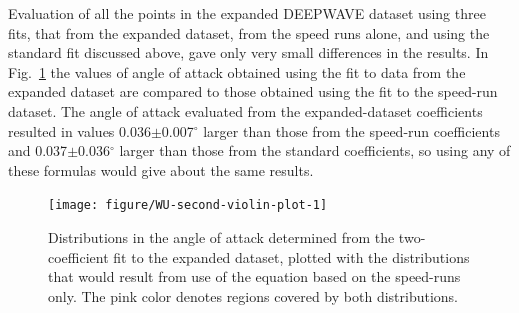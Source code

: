 \documentclass[12pt,twoside,english]{article}\usepackage[]{graphicx}\usepackage[]{color}
\newenvironment{knitrout}{}{} %
\begin{document}
Evaluation of all the points in the expanded DEEPWAVE dataset using three fits, that from the expanded dataset, from the speed runs alone, and using the \textquotedbl{}standard\textquotedbl{} fit discussed above, gave only very small differences in the results. In Fig.~\ref{fig:second-violin-plot} the values of angle of attack obtained using the fit to data from the expanded dataset are compared to those obtained using the fit to the speed-run dataset. 
The angle of attack evaluated from the expanded-dataset coefficients resulted in values  
0.036$\pm$0.007$^{\circ}$  
larger than those from the speed-run coefficients and  
0.037$\pm$0.036$^{\circ}$  
larger than those from the standard coefficients, so using any of these formulas would give about the same results. 


\begin{knitrout}\footnotesize
{}\color{fgcolor}\begin{figure}

{\centering \texttt{[image: figure/WU-second-violin-plot-1]} 

}

\caption[Distributions in the angle of attack determined from the two-coefficient fit to the expanded dataset, plotted with the distributions that would result from use of the equation based on the speed-runs only]{Distributions in the angle of attack determined from the two-coefficient fit to the expanded dataset, plotted with the distributions that would result from use of the equation based on the speed-runs only. The pink color denotes regions covered by both distributions.}\label{fig:second-violin-plot}
\end{figure}


\end{knitrout}

\end{document}
